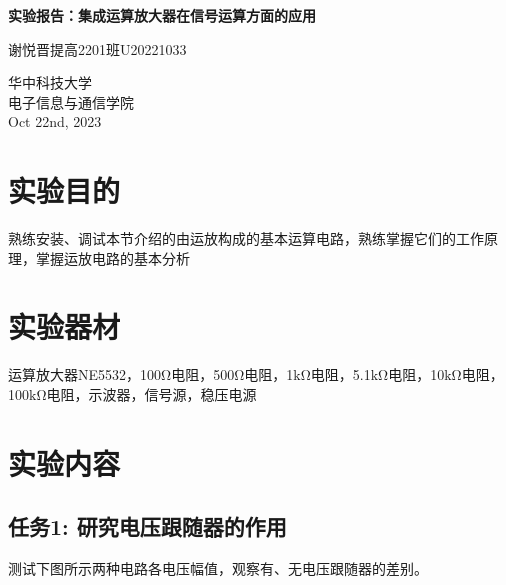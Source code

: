 \documentclass[a4paper,11pt,UTF8]{article}
\begin{document}
	
\begin{titlepage}
	\begin{center}
		\vspace*{1cm}
		\textbf{\LARGE 实验报告：集成运算放大器在信号运算方面的应用}
		
		\vspace{0.5cm}
		\Large 谢悦晋\quad 提高2201班\quad U20221033
		
		\vspace{1cm}
		\begin{figure}[H]
			\centering
			\caption*{}
		\end{figure}
		\vfill
		
		
		\vspace{0.8cm}
		华中科技大学 \\
		电子信息与通信学院 \\
		Oct 22nd, 2023
	\end{center}
\end{titlepage}

\section{实验目的}
熟练安装、调试本节介绍的由运放构成的基本运算电路，熟练掌握它们的工作原理，掌握运放电路的基本分析
\section{实验器材}
运算放大器NE5532，100$\mathrm{\Omega}$电阻，500$\mathrm{\Omega}$电阻，1$\mathrm{k\Omega}$电阻，5.1$\mathrm{k\Omega}$电阻，10$\mathrm{k\Omega}$电阻，100$\mathrm{k\Omega}$电阻，示波器，信号源，稳压电源
\section{实验内容}
\subsection{任务1: 研究电压跟随器的作用}
测试下图所示两种电路各电压幅值，观察有、无电压跟随器的差别。
\end{document}
